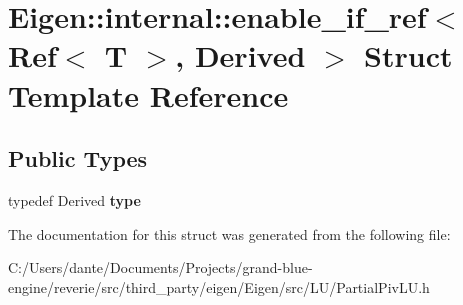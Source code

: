 \hypertarget{struct_eigen_1_1internal_1_1enable__if__ref_3_01_ref_3_01_t_01_4_00_01_derived_01_4}{}\section{Eigen\+::internal\+::enable\+\_\+if\+\_\+ref$<$ Ref$<$ T $>$, Derived $>$ Struct Template Reference}
\label{struct_eigen_1_1internal_1_1enable__if__ref_3_01_ref_3_01_t_01_4_00_01_derived_01_4}
\subsection*{Public Types}
\begin{DoxyCompactItemize}
\item 
\mbox{\label{struct_eigen_1_1internal_1_1enable__if__ref_3_01_ref_3_01_t_01_4_00_01_derived_01_4_acdcd99f53faa27f1a901fb4610528f02}} 
typedef Derived {\bfseries type}
\end{DoxyCompactItemize}


The documentation for this struct was generated from the following file\+:\begin{DoxyCompactItemize}
\item 
C\+:/\+Users/dante/\+Documents/\+Projects/grand-\/blue-\/engine/reverie/src/third\+\_\+party/eigen/\+Eigen/src/\+L\+U/Partial\+Piv\+L\+U.\+h\end{DoxyCompactItemize}
